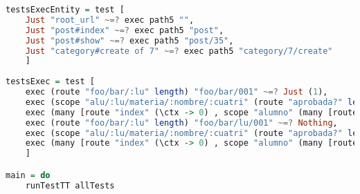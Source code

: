 \documentclass[10pt,a4paper]{article}
\begin{document}
\begin{lstlisting}[language=Haskell,breaklines=true,basicstyle=\tiny]
testsExecEntity = test [
    Just "root_url" ~=? exec path5 "",
    Just "post#index" ~=? exec path5 "post",
    Just "post#show" ~=? exec path5 "post/35",
    Just "category#create of 7" ~=? exec path5 "category/7/create"
    ]
    
testsExec = test [
    exec (route "foo/bar/:lu" length) "foo/bar/001" ~=? Just (1),
    exec (scope "alu/:lu/materia/:nombre/:cuatri" (route "aprobada?" length) ) "alu/002/materia/plp/2c2015/aprobada?" ~=? Just(3),
    exec (many [route "index" (\ctx -> 0) , scope "alumno" (many [route "foo" (\ctx -> 1) , route ":lu/bar" (\ctx -> 2) ])]) "alumno/foo" ~=? Just(1),
    exec (route "foo/bar/:lu" length) "foo/bar/lu/001" ~=? Nothing,
    exec (scope "alu/:lu/materia/:nombre/:cuatri" (route "aprobada?" length) ) "alu/002/materia/plp/2c2015" ~=? Nothing,
    exec (many [route "index" (\ctx -> 0) , scope "alumno" (many [route "foo" (\ctx -> 1) , route ":lu/bar" (\ctx -> 2) ])]) "alumno/001/foo" ~=? Nothing    
    ]

main = do
    runTestTT allTests

\end{lstlisting}
\end{document}
